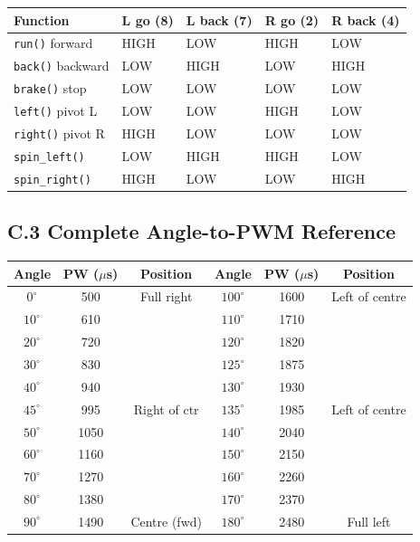 \documentclass[12pt,a4paper]{article}
\begin{document}
\begin{center}
\renewcommand{\arraystretch}{1.3}
\begin{tabular}{L{2.8cm} C{2cm} C{2.2cm} C{2cm} C{2.2cm}}
\toprule
{}
\color{white}\textbf{Function} &
\color{white}\textbf{L go (8)} &
\color{white}\textbf{L back (7)} &
\color{white}\textbf{R go (2)} &
\color{white}\textbf{R back (4)} \\
\midrule
\texttt{run()} forward     & HIGH & LOW  & HIGH & LOW  \\
\texttt{back()} backward   & LOW  & HIGH & LOW  & HIGH \\
\texttt{brake()} stop      & LOW  & LOW  & LOW  & LOW  \\
\texttt{left()} pivot L    & LOW  & LOW  & HIGH & LOW  \\
\texttt{right()} pivot R   & HIGH & LOW  & LOW  & LOW  \\
\texttt{spin\_left()}      & LOW  & HIGH & HIGH & LOW  \\
\texttt{spin\_right()}     & HIGH & LOW  & LOW  & HIGH \\
\bottomrule
\end{tabular}
\end{center}

\subsection*{C.3 \quad Complete Angle-to-PWM Reference}

\begin{center}
\renewcommand{\arraystretch}{1.2}
\begin{tabular}{ccc|ccc}
\toprule
\textbf{Angle} & \textbf{PW ($\mu$s)} & \textbf{Position} &
\textbf{Angle} & \textbf{PW ($\mu$s)} & \textbf{Position} \\
\midrule
$0^\circ$   & 500  & Full right   & $100^\circ$ & 1600 & Left of centre \\
$10^\circ$  & 610  &              & $110^\circ$ & 1710 & \\
$20^\circ$  & 720  &              & $120^\circ$ & 1820 & \\
$30^\circ$  & 830  &              & $125^\circ$ & 1875 & \\
$40^\circ$  & 940  &              & $130^\circ$ & 1930 & \\
$45^\circ$  & 995  & Right of ctr & $135^\circ$ & 1985 & Left of centre \\
$50^\circ$  & 1050 &              & $140^\circ$ & 2040 & \\
$60^\circ$  & 1160 &              & $150^\circ$ & 2150 & \\
$70^\circ$  & 1270 &              & $160^\circ$ & 2260 & \\
$80^\circ$  & 1380 &              & $170^\circ$ & 2370 & \\
$90^\circ$  & 1490 & Centre (fwd) & $180^\circ$ & 2480 & Full left \\
\bottomrule
\end{tabular}
\end{center}
\end{document}
